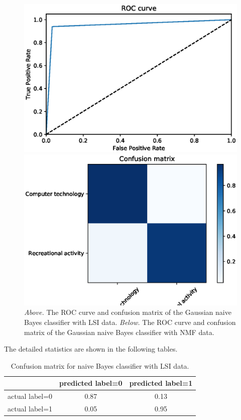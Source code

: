\documentclass[letterpaper]{article}
\begin{document}
\begin{figure}[!htb]
\begin{minipage}{0.5\textwidth}
\includegraphics[width=1.0\textwidth]{roc-nmf-naive-bayes}
\end{minipage}%
\begin{minipage}{0.5\textwidth}
\includegraphics[width=1.0\textwidth]{conf-mat-nmf-naive-bayes}
\end{minipage}
\caption{\emph{Above.} The ROC curve and confusion matrix
of the Gaussian naive Bayes classifier with LSI data.
\emph{Below.} The ROC curve and confusion matrix of the Gaussian naive
Bayes classifier with NMF data.}
\label{fig:nb-2}
\end{figure}

The detailed statistics are shown in the following tables.
\begin{table}[H]
\centering
\begin{tabular}{c|cc}
 & predicted label=0 & predicted label=1 \\ \hline
actual label=0 & 0.87 & 0.13 \\
actual label=1 & 0.05 & 0.95 \\
\end{tabular}
\caption{Confusion matrix for naive Bayes classifier with LSI data.}
\end{table}
\end{document}
